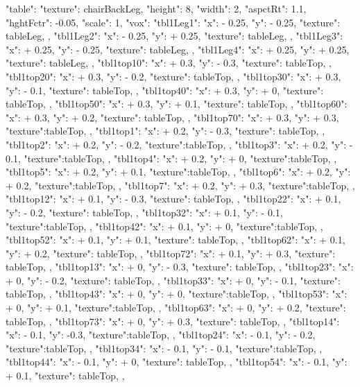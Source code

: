 {  "table": {
    "texture": chairBackLeg,
    "height": 8,
    "width": 2,
    "aspctRt": 1.1,
    "hghtFctr": -0.05,
    "scale": 1,
    "vox": {
      "tbl1Leg1":{ "x": - 0.25, "y": - 0.25, "texture": tableLeg, },
      "tbl1Leg2":{ "x": - 0.25, "y": + 0.25, "texture": tableLeg, },
      "tbl1Leg3":{ "x": + 0.25, "y": - 0.25, "texture": tableLeg, },
      "tbl1Leg4":{ "x": + 0.25, "y": + 0.25, "texture": tableLeg, },
      "tbl1top10":{ "x": + 0.3, "y": - 0.3, "texture": tableTop, },
      "tbl1top20":{ "x": + 0.3, "y": - 0.2, "texture": tableTop, },
      "tbl1top30":{ "x": + 0.3, "y": - 0.1, "texture": tableTop, },
      "tbl1top40":{ "x": + 0.3, "y": + 0, "texture": tableTop, },
      "tbl1top50":{ "x": + 0.3, "y": + 0.1, "texture": tableTop, },
      "tbl1top60":{ "x": + 0.3, "y": + 0.2, "texture": tableTop, },
      "tbl1top70":{ "x": + 0.3, "y": + 0.3, "texture":tableTop, },
      "tbl1top1":{ "x": + 0.2, "y": - 0.3, "texture": tableTop, },
      "tbl1top2":{ "x": + 0.2, "y": - 0.2, "texture":tableTop, },
      "tbl1top3":{ "x": + 0.2, "y": - 0.1, "texture":tableTop, },
      "tbl1top4":{ "x": + 0.2, "y": + 0, "texture":tableTop, },
      "tbl1top5":{ "x": + 0.2, "y": + 0.1, "texture":tableTop, },
      "tbl1top6":{ "x": + 0.2, "y": + 0.2, "texture":tableTop, },
      "tbl1top7":{ "x": + 0.2, "y": + 0.3, "texture":tableTop, },
      "tbl1top12":{ "x": + 0.1, "y": - 0.3, "texture": tableTop, },
      "tbl1top22":{ "x": + 0.1, "y": - 0.2, "texture": tableTop, },
      "tbl1top32":{ "x": + 0.1, "y": - 0.1, "texture":tableTop, },
      "tbl1top42":{ "x": + 0.1, "y": + 0, "texture":tableTop, },
      "tbl1top52":{ "x": + 0.1, "y": + 0.1, "texture": tableTop, },
      "tbl1top62":{ "x": + 0.1, "y": + 0.2, "texture": tableTop, },
      "tbl1top72":{ "x": + 0.1, "y": + 0.3, "texture": tableTop, },
      "tbl1top13":{ "x": + 0, "y": - 0.3, "texture": tableTop, },
      "tbl1top23":{ "x": + 0, "y": - 0.2, "texture": tableTop, }, 
      "tbl1top33":{ "x": + 0, "y": - 0.1, "texture": tableTop, },
      "tbl1top43":{ "x": + 0, "y": + 0, "texture":tableTop, },
      "tbl1top53":{ "x": + 0, "y": + 0.1, "texture":tableTop, },
      "tbl1top63":{ "x": + 0, "y": + 0.2, "texture": tableTop, },
      "tbl1top73":{ "x": + 0, "y": + 0.3, "texture": tableTop, },
      "tbl1top14":{ "x": - 0.1, "y":  -0.3, "texture":tableTop, },
      "tbl1top24":{ "x": - 0.1, "y": - 0.2, "texture":tableTop, },
      "tbl1top34":{ "x": - 0.1, "y": - 0.1, "texture":tableTop, },
      "tbl1top44":{ "x": - 0.1, "y": + 0, "texture": tableTop, },
      "tbl1top54":{ "x": - 0.1, "y": + 0.1, "texture": tableTop, },
}}}
